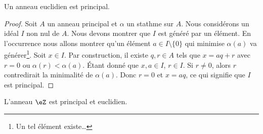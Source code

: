 \begin{proposition}\label{Propkllxnv}
    Un anneau euclidien est principal.
\end{proposition}

\begin{proof}
    Soit \( A\) un anneau principal et \( \alpha\) un stathme sur \( A\). Nous considérons un idéal \( I\) non nul de \( A\). Nous devons montrer que \( I\) est généré par un élément. En l'occurrence nous allons montrer qu'un élément \( a\in I\setminus\{ 0 \}\) qui minimise \( \alpha(a)\) va générer\footnote{Un tel élément existe\dots}. Soit \( x\in I\). Par construction, il existe \( q,r\in A\) tels que \( x=aq+r\) avec \( r=0\) ou \( \alpha(r)<\alpha(a)\). Étant donné que \( x,a\in I\), \( r\in I\). Si \( r\neq 0\), alors \( r\) contredirait la minimalité de \( \alpha(a)\). Donc \( r=0\) et \( x=aq\), ce qui signifie que \( I\) est principal.
\end{proof}

\begin{proposition}     \label{PROPooPJGLooQSrJTU}
    L'anneau \( \eZ\) est principal et euclidien.
\end{proposition}

